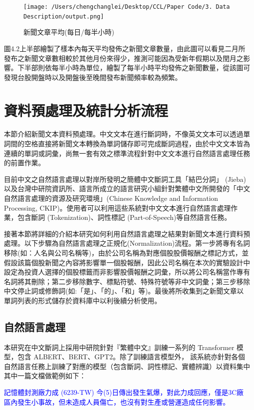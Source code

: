 \begin{figure}[H]
\centering
\texttt{[image: /Users/chengchanglei/Desktop/CCL/Paper Code/3. Data Description/output.png]}
\caption{新聞文章平均(每日/每半小時)}
\end{figure}
圖4.2上半部繪製了樣本內每天平均發佈之新聞文章數量，由此圖可以看見二月所發布之新聞文章數相較於其他月份來得少，推測可能因為受新年假期以及閏月之影響。下半部則依每半小時為單位，繪製了每半小時平均發佈之新聞數量，從該圖可發現台股開盤時以及開盤後至晚間發布新聞頻率較為頻繁。

\clearpage

\section{資料預處理及統計分析流程}
本節介紹新聞文本資料預處理。中文文本在進行斷詞時，不像英文文本可以透過單詞間的空格直接將新聞文本轉換為單詞儲存即可完成斷詞過程，由於中文文本皆為連續的單詞或詞彙，尚無一套有效之標準流程針對中文文本進行自然語言處理任務的前置作業。

目前中文之自然語言處理以對岸所發明之簡體中文斷詞工具「結巴分詞」 (Jieba) 以及台灣中研院資訊所、語言所成立的語言研究小組針對繁體中文所開發的「中文自然語言處理的資源及研究環境」(Chinese Knowledge and Information Processing, CKIP)。使用者可以利用這些系統對中文文本進行自然語言處理作業，包含斷詞 (Tokenization)、詞性標記 (Part-of-Speech)等自然語言任務。

接著本節將詳細的介紹本研究如何利用自然語言處理之結果對新聞文本進行資料預處理。以下步驟為自然語言處理之正規化(Normalization)流程。第一步將專有名詞移除(如：人名與公司名稱等)，由於公司名稱為對應個股股價報酬之標記方式，並假設該篇個股新聞之內容將影響單一個股報酬，因此公司名稱在本次的實驗設計中設定為投資人選擇的個股標籤而非影響股價報酬之詞彙，所以將公司名稱當作專有名詞將其刪除；第二步移除數字、標點符號、特殊符號等非中文詞彙；第三步移除中文停止詞或修飾詞(如:「是」、「的」、「和」等)。最後將所收集到之新聞文章以單詞列表的形式儲存於資料庫中以利後續分析使用。
\subsection{自然語言處理}
本研究在中文斷詞上採用中研院針對『繁體中文』訓練一系列的 Transformer 模型，包含 ALBERT、BERT、GPT2。除了訓練語言模型外， 該系統亦針對各個自然語言任務上訓練了對應的模型（包含斷詞、詞性標記、實體辨識）以資料集中其中一篇文檔做範例如下：
\\[0.6ex]
\begin{tcolorbox}

{\textcolor{blue}{記憶體封測廠力成 (6239-TW) 今(5)日傳出發生氣爆，對此力成回應，僅是3C廠區內發生小事故，但未造成人員傷亡，也沒有對生產或營運造成任何影響。}}
\end{tcolorbox}

